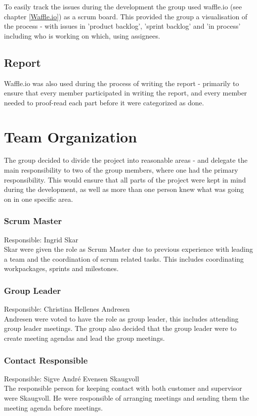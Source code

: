 To easily track the issues during the development the group used waffle.io (see chapter  \ref{Waffle.io}) as a scrum board. This provided the group a visualisation of the process - with issues in 'product backlog', 'sprint backlog' and 'in process' including who is working on which, using assignees. 

\subsection{Report}
Waffle.io was also used during the process of writing the report - primarily to ensure that every member participated in writing the report, and every member needed to proof-read each part before it were categorized as done.  


\section{Team Organization}\label{projectOrganisation}
The group decided to divide the project into reasonable areas - and delegate the main responsibility to two of the group members, where one had the primary responsibility. This would ensure that all parts of the project were kept in mind during the development, as well as more than one person knew what was going on in one specific area.

\subsubsection{Scrum Master}
Responsible: Ingrid Skar \\
Skar were given the role as Scrum Master due to previous experience with leading a team and the coordination of scrum related tasks. This includes coordinating workpackages, sprints and milestones.

\subsubsection{Group Leader}
Responsible: Christina Hellenes Andresen \\
Andresen were voted to have the role as group leader, this includes attending group leader meetings. The group also decided that the group leader were to create meeting agendas and lead the group meetings. 

\subsubsection{Contact Responsible}
Responsible: Sigve André Evensen Skaugvoll \\
The responsible person for keeping contact with both customer and supervisor were Skaugvoll. He were responsible of arranging meetings and sending them the meeting agenda before meetings.

